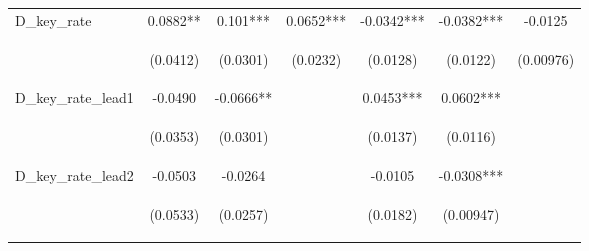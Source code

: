 \begin{tabular}{lcccccc}
D\_key\_rate & 0.0882** & 0.101*** & 0.0652*** & -0.0342*** & -0.0382*** & -0.0125 \\
\vspace{4pt} & \begin{footnotesize}(0.0412)\end{footnotesize} & \begin{footnotesize}(0.0301)\end{footnotesize} & \begin{footnotesize}(0.0232)\end{footnotesize} & \begin{footnotesize}(0.0128)\end{footnotesize} & \begin{footnotesize}(0.0122)\end{footnotesize} & \begin{footnotesize}(0.00976)\end{footnotesize} \\
D\_key\_rate\_lead1 & -0.0490 & -0.0666** &  & 0.0453*** & 0.0602*** &  \\
\vspace{4pt} & \begin{footnotesize}(0.0353)\end{footnotesize} & \begin{footnotesize}(0.0301)\end{footnotesize} & \begin{footnotesize}\end{footnotesize} & \begin{footnotesize}(0.0137)\end{footnotesize} & \begin{footnotesize}(0.0116)\end{footnotesize} & \begin{footnotesize}\end{footnotesize} \\
D\_key\_rate\_lead2 & -0.0503 & -0.0264 &  & -0.0105 & -0.0308*** &  \\
\vspace{4pt} & \begin{footnotesize}(0.0533)\end{footnotesize} & \begin{footnotesize}(0.0257)\end{footnotesize} & \begin{footnotesize}\end{footnotesize} & \begin{footnotesize}(0.0182)\end{footnotesize} & \begin{footnotesize}(0.00947)\end{footnotesize} & \begin{footnotesize}\end{footnotesize} \\

\end{tabular}
